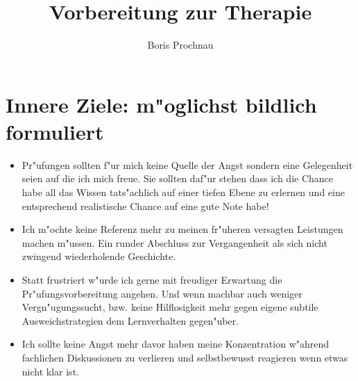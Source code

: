 \documentclass[11pt,a4paper,german]{article}
\author{Boris Prochnau}
\title{Vorbereitung zur Therapie}
\begin{document}
\maketitle

\section{Innere Ziele: m"oglichst bildlich formuliert}
\begin{itemize}
	\item Pr"ufungen sollten f"ur mich keine Quelle der Angst sondern eine Gelegenheit seien auf die ich mich freue. Sie sollten daf"ur stehen dass ich die Chance habe all das Wissen tats"achlich auf einer tiefen Ebene zu erlernen und eine entsprechend realistische Chance auf eine gute Note habe!
	\item Ich m"ochte keine Referenz mehr zu meinen fr"uheren versagten Leistungen machen m"ussen. Ein runder Abschluss zur Vergangenheit als sich nicht zwingend wiederholende Geschichte.
	\item Statt frustriert w"urde ich gerne mit freudiger Erwartung die Pr"ufungsvorbereitung angehen. Und wenn machbar auch weniger Vergn"ugungssucht, bzw. keine Hilflosigkeit mehr gegen eigene subtile Ausweichstrategien dem Lernverhalten gegen"uber.
	\item Ich sollte keine Angst mehr davor haben meine Konzentration w"ahrend fachlichen Diskussionen zu verlieren und selbstbewusst reagieren wenn etwas nicht klar ist.
\end{itemize}
\end{document}
